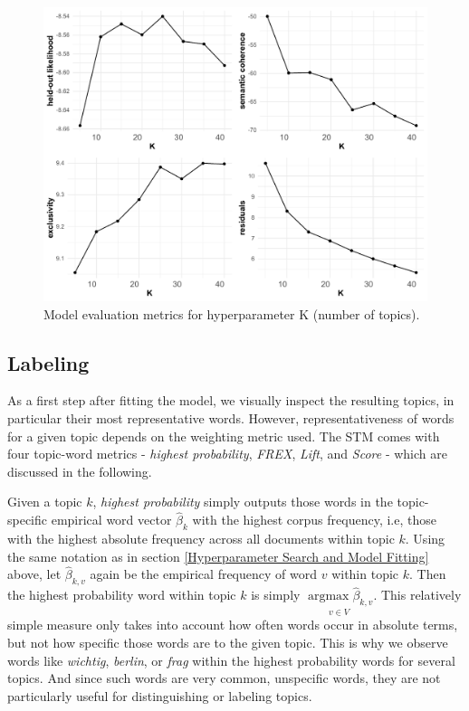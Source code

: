 \begin{figure}[h!]
  \centering
  \captionsetup{justification=centering,margin=2cm}
  \includegraphics[scale = 0.5]{../plots/4_1/searchK.pdf}
  \caption{Model evaluation metrics for hyperparameter K (number of topics).}
  \label{fig:searchK}
\end{figure}

\subsection{Labeling}
\label{Labeling}

As a first step after fitting the model, we visually inspect the resulting topics, in particular their most representative words. However, representativeness of words for a given topic depends on the weighting metric used. The STM comes with four topic-word metrics - \textit{highest probability}, \textit{FREX}, \textit{Lift}, and \textit{Score} - which are discussed in the following.

Given a topic $k$, \textit{highest probability} simply outputs those words in the topic-specific empirical word vector $\hat{\beta}_{k}$ with the highest corpus frequency, i.e, those with the highest absolute frequency across all documents within topic $k$. Using the same notation as in section \ref{Hyperparameter Search and Model Fitting} above, let $\hat{\beta}_{k,v}$ again be the empirical frequency of word $v$ within topic $k$. Then the highest probability word within topic $k$ is simply $\underset{v \in V}{\operatorname{argmax}\hat{\beta}_{k,v}}$. This relatively simple measure only takes into account how often words occur in absolute terms, but not how specific those words are to the given topic. This is why we observe words like \textit{wichtig}, \textit{berlin}, or \textit{frag} within the highest probability words for several topics. And since such words are very common, unspecific words, they are not particularly useful for distinguishing or labeling topics.

